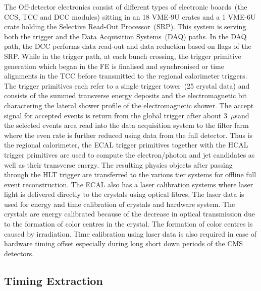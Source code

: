 The Off-detector electronics consist of different types of electronic boards~(the CCS, TCC and DCC modules) sitting in an 18 VME-9U crates and a 1 VME-6U crate holding the Selective Read-Out Processor~(SRP). This system is serving both the trigger and the  Data Acquisition Systems~(DAQ) paths. In the DAQ path, the DCC performs data read-out and data reduction based on flags of the SRP. While in the trigger path, at each bunch crossing, the trigger primitive generation which began in the FE is finalised and synchronised or time alignments in the TCC before transmitted to the regional calorimeter triggers. The trigger primitives each refer to a single trigger tower~(25 crystal data) and consists of  the summed transverse energy deposits and the electromagnetic bit charactering the lateral shower profile of the electromagnetic shower. The accept signal for accepted events is return from the global trigger after about 3~$\mu$sand the selected events area read into the data acquisition system to the filter farm where the even rate is further reduced using data from the full detector. Thus is the regional calorimeter, the ECAL trigger primitives  together with the HCAL trigger primitives are used to  compute the electron/photon and jet candidates as well as their transverse energy. The resulting physics objects after passing through the HLT trigger are transferred to the various tier systems for offline full event reconstruction. The ECAL also has a laser calibration systems where laser light is delivered directly to the \pb crystals using optical fibres. The laser data is used for energy and time calibration of crystals and hardware system. The crystals are energy calibrated because of the decrease in optical transmission due to the formation of color centres in the crystal. The formation of color centres is caused by irradiation. Time calibration using laser data is also required in case of hardware timing offset especially during long short down periods of the CMS detectors.
\subsection{Timing Extraction}



